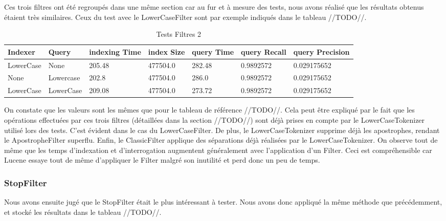 Ces trois filtres ont été regroupés dans une même section car au fur et à mesure des tests, nous avons réalisé que les résultats obtenus étaient très similaires. Ceux du test avec le LowerCaseFilter sont par exemple indiqués dans le tableau //TODO//.

\begin{table}[H]
                \centering
                \begin{tabular}{|p{2cm}|p{2cm}|p{2cm}|p{2cm}|p{2cm}|p{2cm}|p{2cm}|}
                    \hline
                    \textbf{Indexer} & \textbf{Query} & \textbf{indexing Time} & \textbf{index Size} & \textbf{query Time} & \textbf{query Recall} & \textbf{query Precision}\\
                    \hline
LowerCase & None & 205.48 & 477504.0 & 282.48 & 0.9892572 & 0.029175652\\
		\hline
None & Lowercase & 202.8 & 477504.0 & 286.0 & 0.9892572 & 0.029175652\\
		\hline
LowerCase & LowerCase & 209.08 & 477504.0 & 273.72 & 0.9892572 & 0.029175652\\
                    \hline
                \end{tabular}
                \caption{Tests Filtres 2}
                \label{tab:tests_filtres_2}
            \end{table}

On constate que les valeurs sont les mêmes que pour le tableau de référence //TODO//. Cela peut être expliqué par le fait que les opérations effectuées par ces trois filtres (détaillées dans la section //TODO//) sont déjà prises en compte par le LowerCaseTokenizer utilisé lors des tests. C’est évident dans le cas du LowerCaseFilter. De plus, le LowerCaseTokenizer supprime déjà les apostrophes, rendant le ApostropheFilter superflu. Enfin, le ClassicFilter applique des séparations déjà réalisées par le LowerCaseTokenizer. On observe tout de même que les temps d’indexation et d’interrogation augmentent généralement  avec l’application d’un Filter. Ceci est compréhensible car Lucene essaye tout de même d’appliquer le Filter malgré son inutilité et perd donc un peu de temps.

\subsubsection{StopFilter}

Nous avons ensuite jugé que le StopFilter était le plus intéressant à tester. Nous avons donc appliqué la même méthode que précédemment, et stocké les résultats dans le tableau //TODO//.


